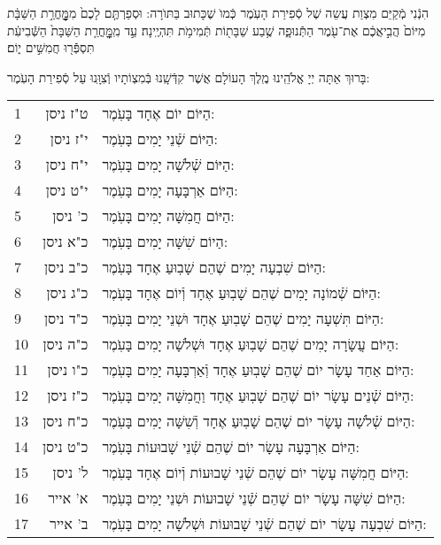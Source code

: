 \documentclass[twoside, openany, parskip=half, 11pt]{book}
\begin{document}
הִנְֿנִי מְֿקַיֵּם מִצְוַת עֲשֵה שֶׁל סְֿפִירַת הָעֽׂמֶר כְּֿמוׂ שֶׁכָּתוּב בַּתּוׂרָה: וּסְפַרְתֶּ֤ם לָכֶם֙ מִמׇׇׇׇׇׇׇׇׇׇׇׇָּחֳרַ֣ת הַשַּׁבָּ֔ת מִיּוֹם֙ הֲבִ֣יאֲכֶ֔ם אֶת־עֹ֖מֶר הַתְּֿֿנוּפָ֑ה שֶׁ֥בַע שַׁבָּת֖וֹת תְּֿמִימֹ֥ת תִּהְיֶֽינָה׃ עַ֣ד מִֽמׇׇׇׇׇׇׇׇׇׇׇׇָּחֳרַ֤ת הַשַּׁבָּת֙ הַשְּֿֿׁבִיעִ֔ת תִּסְפְּֿֿֿר֖וּ חֲמִשִּׁ֣ים י֑וֹם׃

בָּרוּךְ אַתָּה יְיָ אֱלֹהֵֽינוּ מֶֽלֶךְ הָעוֹלָם אֲשֶׁר קִדְּֿשָֽׁנוּ בְּֿמִצְוֹתָיו וְֿצִוָּֽנוּ עַל סְֿפִירַת הָעֹֽמֶר:\\

\begin{scriptsize}
\begin{longtable}{ l | r | p{} }
1 & ט"ז ניסן & הַיּוֹם יוֹם אֶחָד בָּעֹֽמֶר: \\
2 & י"ז ניסן & הַיּוֹם שְֿׁנֵי יָמִים בָּעֹֽמֶר: \\
3 & י"ח ניסן & הַיּוֹם שְֿׁלֹשָׁה יָמִים בָּעֹֽמֶר: \\
4 & י"ט ניסן & הַיּוֹם אַרְבָּעָה יָמִים בָּעֹֽמֶר: \\
5 & כ' ניסן & הַיּוֹם חֲמִשָּׁה יָמִים בָּעֹֽמֶר: \\
6 & כ"א ניסן & הַיוֹם שִׁשָּׁה יָמִים בָּעֹֽמֶר: \\
7 & כ"ב ניסן & הַיּוֹם שִׁבְעָה יָמִים שֶׁהֵם שָׁבֽוּעַ אֶחָד בָּעֹֽמֶר: \\
8 & כ"ג ניסן & הַיּוֹם שְֿׁמוֹנָה יָמִים שֶׁהֵם שָׁבֽוּעַ אֶחָד וְֿיוֹם אֶחָד בָּעֹֽמֶר: \\
9 & כ"ד ניסן & הַיּוֹם תִּשְׁעָה יָמִים שֶׁהֵם שָׁבֽוּעַ אֶחָד וּשְׁנֵי יָמִים בָּעֹֽמֶר: \\
10 & כ"ה ניסן & הַיּוֹם עֲשָׂרָה יָמִים שֶׁהֵם שָׁבֽוּעַ אֶחָד וּשְׁלֹשָׁה יָמִים בָּעֹֽמֶר: \\
11 & כ"ו ניסן & הַיּוֹם אַחַד עָשָׂר יוֹם שֶׁהֵם שָׁבֽוּעַ אֶחָד וְֿאַרְבָּעָה יָמִים בָּעֹֽמֶר: \\
12 & כ"ז ניסן & הַיּוֹם שְֿׁנֵים עָשָׂר יוֹם שֶׁהֵם שָׁבֽוּעַ אֶחָד וַחֲמִשָּׁה יָמִים בָּעֹֽמֶר: \\
13 & כ"ח ניסן & הַיּוֹם שְֿׁלֹשָׁה עָשָׂר יוֹם שֶׁהֵם שָׁבֽוּעַ אֶחָד וְֿשִׁשָּׁה יָמִים בָּעֹֽמֶר: \\
14 & כ"ט ניסן & הַיּוֹם אַרְבָּעָה עָשָׂר יוֹם שֶׁהֵם שְֿׁנֵי שָׁבוּעוֹת בָּעֹֽמֶר: \\
15 & ל' ניסן & הַיּוֹם חֲמִשָּׁה עָשָׂר יוֹם שֶׁהֵם שְֿׁנֵי שָׁבוּעוֹת וְֿיוֹם אֶחָד בָּעֹֽמֶר: \\
16 & א' אייר & הַיּוֹם שִׁשָּׁה עָשָׂר יוֹם שֶׁהֵם שְֿׁנֵי שָׁבוּעוֹת וּשְׁנֵי יָמִים בָּעֹֽמֶר: \\
17 & ב' אייר & הַיּוֹם שִׁבְעָה עָשָׂר יוֹם שֶׁהֵם שְֿׁנֵי שָׁבוּעוֹת וּשְׁלֹשָׁה יָמִים בָּעֹֽמֶר: \\

\end{longtable}
\end{scriptsize}
\end{document}
